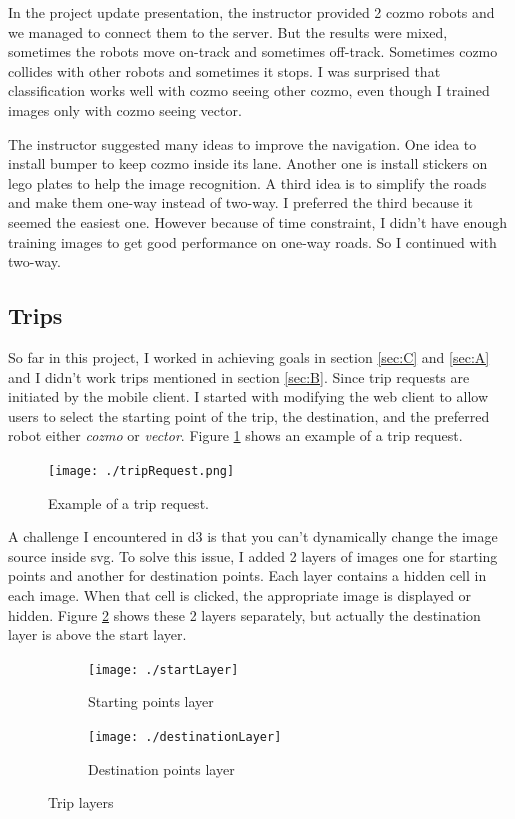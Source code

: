 \documentclass[12pt,a4paper]{article}
\begin{document}
In the project update presentation, the instructor provided 2 cozmo robots and we managed to connect them to the server. But the results were mixed, sometimes the robots move on-track and sometimes off-track. Sometimes cozmo collides with other robots and sometimes it stops. I was surprised that classification works well with cozmo seeing other cozmo, even though I trained images only with cozmo seeing vector. 

The instructor suggested many ideas to improve the navigation. One idea to install bumper to keep cozmo inside its lane. Another one is install stickers on lego plates to help the image recognition. A third idea is to simplify the roads and make them one-way instead of two-way. I preferred the third because it seemed the easiest one. However because of time constraint, I didn't have enough training images to get good performance on one-way roads. So I continued with two-way. 
 

\subsection{Trips}

So far in this project, I worked in achieving goals in section \ref{sec:C} and \ref{sec:A} and I didn't work trips mentioned in section \ref{sec:B}. Since trip requests are initiated by the mobile client. I started with modifying the web client to allow users to select the starting point of the trip, the destination, and the preferred robot either \textit{cozmo} or \textit{vector}. Figure \ref{fig:tripRequest} shows an example of a trip request. 

\begin{figure}[H]
\center
\texttt{[image: ./tripRequest.png]}
\caption{Example of a trip request.} \label{fig:tripRequest}
\end{figure}

A challenge I encountered in d3 is that you can't dynamically change the image source inside svg. To solve this issue, I added 2 layers of images one for starting points and another for destination points. Each layer contains a hidden cell in each image. When that cell is clicked, the appropriate image is displayed or hidden. Figure \ref{fig:layers} shows these 2 layers separately, but actually the destination layer is above the start layer. 
\begin{figure}[H]
     \center
     \begin{subfigure}[b]{0.45\textwidth}
         \centering
         \texttt{[image: ./startLayer]}
         \caption{Starting points layer}
     \end{subfigure}
     \hfill
     \begin{subfigure}[b]{0.45\textwidth}
         \centering
         \texttt{[image: ./destinationLayer]}
         \caption{Destination points layer}
     \end{subfigure}
     \caption{Trip layers}
     \label{fig:layers}
\end{figure}
\end{document}
